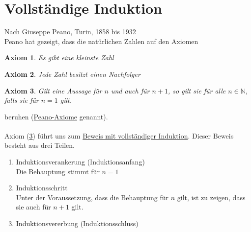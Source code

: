 \documentclass{report}
\newtheorem{axiom}{Axiom}
\begin{document}
\section{Vollständige Induktion}
Nach Giuseppe Peano, Turin, 1858 bis 1932\\
Peano hat gezeigt, dass die natürlichen Zahlen auf den Axiomen
\begin{axiom}Es gibt eine kleinste Zahl\end{axiom}
\begin{axiom}Jede Zahl besitzt einen Nachfolger\end{axiom}
\begin{axiom}Gilt eine Aussage für $n$ und auch für $n + 1$, so gilt sie für alle $n \in \mathbb{N}$, falls sie für $n = 1$ gilt. \label{PeanoAxiom3}\end{axiom}
beruhen (\underline{Peano-Axiome} genannt).\\\\
Axiom (\ref{PeanoAxiom3}) führt uns zum \underline{Beweis mit vollständiger Induktion}. Dieser Beweis besteht aus drei Teilen.
\begin{enumerate}
\item Induktionsverankerung (Induktionsanfang)\\
Die Behauptung stimmt für $n = 1$
\item Induktionsschritt\\
Unter der Voraussetzung, dass die Behauptung für $n$ gilt, ist zu zeigen, dass sie auch für $n+1$ gilt.
\item Induktionsvererbung (Induktionsschluss)\end{enumerate}
\end{document}
